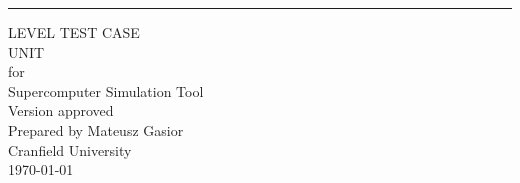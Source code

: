 \begin{flushright}
    \rule{16cm}{5pt}\vskip1cm
    \begin{bfseries}
        \Huge{LEVEL TEST CASE\\UNIT}\\
        \vspace{1.9cm}
        for\\
        \vspace{1.9cm}
	    Supercomputer Simulation Tool\\
        \vspace{1.9cm}
        \LARGE{Version \myversion approved}\\
        \vspace{1.9cm}
        Prepared by Mateusz Gasior\\
        \vspace{1.9cm}
        Cranfield University\\
        \vspace{1.9cm}
        \today\\
    \end{bfseries}
\end{flushright}